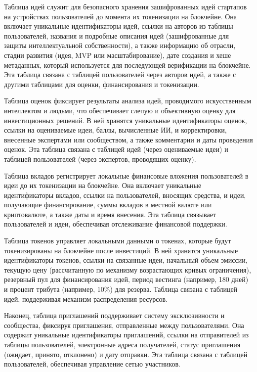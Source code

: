 \documentclass[
    14pt,
    specialist,
    candidate, %
    subf, %
    href,
    dotsinheaders=false
]{disser}
\begin{document}
Таблица идей служит для безопасного хранения зашифрованных идей стартапов на устройствах пользователей до момента их токенизации на блокчейне. Она включает уникальные идентификаторы идей, ссылки на авторов из таблицы пользователей, названия и подробные описания идей (зашифрованные для защиты интеллектуальной собственности), а также информацию об отрасли, стадии развития (идея, MVP или масштабирование), дате создания и хеше метаданных, который используется для последующей верификации на блокчейне. Эта таблица связана с таблицей пользователей через авторов идей, а также с другими таблицами для оценки, финансирования и токенизации.

Таблица оценок фиксирует результаты анализа идей, проводимого искусственным интеллектом и людьми, что обеспечивает слепую и объективную оценку для инвестиционных решений. В ней хранятся уникальные идентификаторы оценок, ссылки на оцениваемые идеи, баллы, вычисленные ИИ, и корректировки, внесенные экспертами или сообществом, а также комментарии и даты проведения оценок. Эта таблица связана с таблицей идей (через оцениваемые идеи) и таблицей пользователей (через экспертов, проводящих оценку).

Таблица вкладов регистрирует локальные финансовые вложения пользователей в идеи до их токенизации на блокчейне. Она включает уникальные идентификаторы вкладов, ссылки на пользователей, вносящих средства, и идеи, получающие финансирование, суммы вкладов в местной валюте или криптовалюте, а также даты и время внесения. Эта таблица связывает пользователей и идеи, обеспечивая отслеживание финансовой поддержки.

Таблица токенов управляет локальными данными о токенах, которые будут токенизированы на блокчейне после инвестиций. В ней хранятся уникальные идентификаторы токенов, ссылки на связанные идеи, начальный объем эмиссии, текущую цену (рассчитанную по механизму возрастающих кривых ограничения), резервный пул для финансирования идей, период вестинга (например, 180 дней) и процент трибута (например, 10\%) для резерва. Таблица связана с таблицей идей, поддерживая механизм распределения ресурсов.

Наконец, таблица приглашений поддерживает систему эксклюзивности и сообщества, фиксируя приглашения, отправленные между пользователями. Она содержит уникальные идентификаторы приглашений, ссылки на отправителей из таблицы пользователей, электронные адреса получателей, статус приглашения (ожидает, принято, отклонено) и дату отправки. Эта таблица связана с таблицей пользователей, обеспечивая управление сетью участников.
\end{document}

